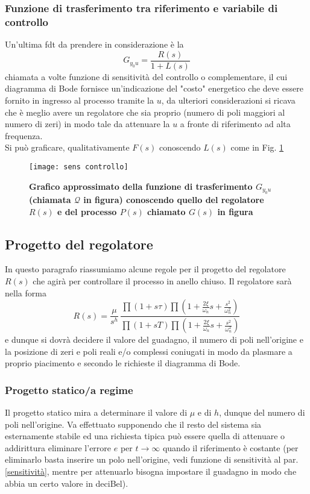 \documentclass[a4paper]{article}
\begin{document}
	\subsubsection*{Funzione di trasferimento tra riferimento e variabile di controllo}
	Un'ultima fdt da prendere in considerazione è la \[G_{y_0u}=\dfrac{R(s)}{1+L(s)}\] chiamata a volte funzione di sensitività del controllo o complementare, il cui diagramma di Bode fornisce un'indicazione del "costo" energetico che deve essere fornito in ingresso al processo tramite la $u$, da ulteriori considerazioni si ricava che è meglio avere un regolatore che sia proprio (numero di poli maggiori al numero di zeri) in modo tale da attenuare la $u$ a fronte di riferimento ad alta frequenza.
	\\Si può graficare, qualitativamente $ F(s) $ conoscendo $ L(s) $ come in Fig. \ref{fig:Q(s)}
	\begin{figure}[htbp]
		\centering
		\texttt{[image: sens controllo]}
		\caption{\textbf{Grafico approssimato della funzione di trasferimento $ G_{y_0u} $ (chiamata $ \mathcal{Q} $ in figura) conoscendo quello del regolatore $ R(s) $ e del processo $ P(s) $ chiamato $ G(s) $ in figura}}\label{fig:Q(s)}
	\end{figure}
	\subsection{Progetto del regolatore}
	In questo paragrafo riassumiamo alcune regole per il progetto del regolatore $ R(s) $ che agirà per controllare il processo in anello chiuso. Il regolatore sarà nella forma 
	\[R(s)=\dfrac{\mu}{s^h}\,\dfrac{\prod(1+s\tau)\prod(1+\frac{2\xi}{\omega_n}s+\frac{s^2}{\omega_n^2})}{\prod(1+sT)\prod(1+\frac{2\xi}{\omega_n}s+\frac{s^2}{\omega_n^2})}\] e dunque si dovrà decidere il valore del guadagno, il numero di poli nell'origine e la posizione di zeri e poli reali e/o complessi coniugati in modo da plasmare a proprio piacimento e secondo le richieste il diagramma di Bode.
	\subsubsection{Progetto statico/a regime}
	Il progetto statico mira a determinare il valore di $\mu$ e di $h$, dunque del numero di poli nell'origine. Va effettuato supponendo che il resto del sistema sia esternamente stabile ed una richiesta tipica può essere quella di attenuare o addirittura eliminare l'errore $ e $ per $ t\to\infty $ quando il riferimento è costante (per eliminarlo basta inserire un polo nell'origine, vedi funzione di sensitività al par. \ref{sensitività}, mentre per attenuarlo bisogna impostare il guadagno in modo che abbia un certo valore in deciBel).
\end{document}

